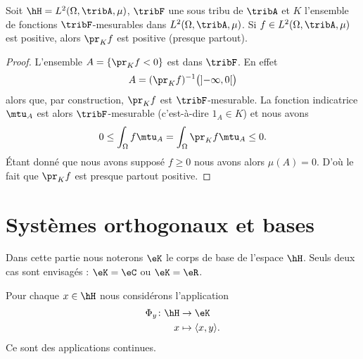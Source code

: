 \begin{proposition}
	Soit \( \hH=L^2(\Omega,\tribA,\mu)\), \( \tribF\) une sous tribu de \( \tribA\) et \( K\) l'ensemble de fonctions \( \tribF\)-mesurables dans \( L^2(\Omega,\tribA,\mu)\). Si \( f\in L^2(\Omega,\tribA,\mu)\) est positive, alors \( \pr_Kf\) est positive (presque partout).
\end{proposition}

\begin{proof}
	L'ensemble \( A=\{ \pr_Kf<0 \}\) est dans \( \tribF\). En effet
	\begin{equation}
		A=(\pr_Kf)^{-1}\big( \mathopen] -\infty , 0 \mathclose[\big)
	\end{equation}
	alors que, par construction, \( \pr_Kf\) est \( \tribF\)-mesurable. La fonction indicatrice \( \mtu_A\) est alors \( \tribF\)-mesurable (c'est-à-dire \( 1_A\in K\)) et nous avons
	\begin{equation}
		0\leq\int_{\Omega}f\mtu_A=\int_{\Omega}\pr_Kf\mtu_A\leq 0.
	\end{equation}
	Étant donné que nous avons supposé \( f\geq 0\) nous avons alors \( \mu(A)=0\). D'où le fait que \( \pr_Kf\) est presque partout positive.
\end{proof}


\section{Systèmes orthogonaux et bases}

Dans cette partie nous noterons \( \eK\) le corps de base de l'espace \( \hH\). Seuls deux cas sont envisagés : \( \eK=\eC\) ou \( \eK=\eR\).

Pour chaque \( x\in\hH\) nous considérons l'application
\begin{equation}        \label{EQooMWZAooZUFKOs}
	\begin{aligned}
		\Phi_y\colon \hH & \to \eK                       \\
		x                & \mapsto \langle x, y\rangle .
	\end{aligned}
\end{equation}
Ce sont des applications continues.

